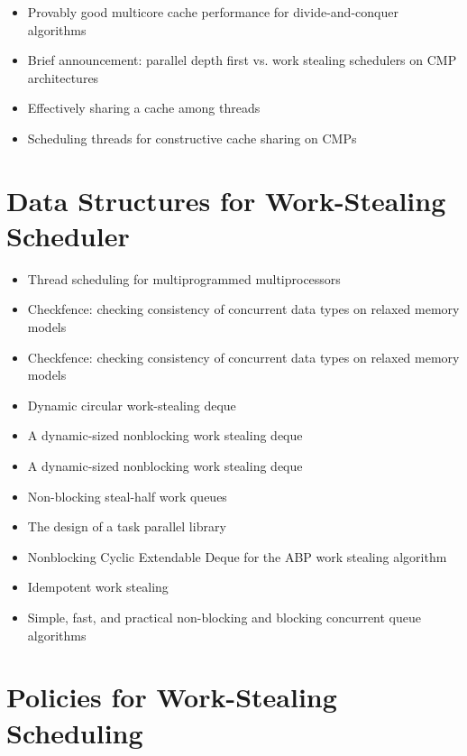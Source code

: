 \begin{itemize}
\item Provably good multicore cache performance for divide-and-conquer
  algorithms \cite{Blelloch2008}
\item Brief announcement: parallel depth first vs. work stealing
  schedulers on CMP architectures \cite{Liaskovitis2006}
\item Effectively sharing a cache among threads \cite{Blelloch2004}
\item Scheduling threads for constructive cache sharing on CMPs
  \cite{Chen2007}
\end{itemize}


\section*{Data Structures for Work-Stealing Scheduler}
\label{sec:lr-data-structures-for-work-stealing-scheduler}

\begin{itemize}
\item[\checkmark] Thread scheduling for multiprogrammed
  multiprocessors \cite{Arora2001}
\item Checkfence: checking consistency of concurrent data types on
  relaxed memory models \cite{Burckhardt2007}
\item Checkfence: checking consistency of concurrent data types on
  relaxed memory models \cite{Burckhardt2007a}
\item Dynamic circular work-stealing deque \cite{Chase2005}
\item A dynamic-sized nonblocking work stealing deque
  \cite{Hendler2006}
\item A dynamic-sized nonblocking work stealing deque
  \cite{Hendler2006a}
\item Non-blocking steal-half work queues \cite{Hendler2002}
\item The design of a task parallel library \cite{Leijen2009}
\item Nonblocking Cyclic Extendable Deque for the ABP work stealing
  algorithm \cite{Lev2005}
\item Idempotent work stealing \cite{Michael2009}
\item Simple, fast, and practical non-blocking and blocking concurrent
  queue algorithms \cite{Michael1996}
\end{itemize}


\section*{Policies for Work-Stealing Scheduling}
\label{sec:lr-policies-for-work-stealing-scheduling}

